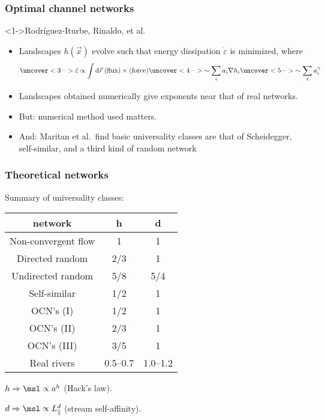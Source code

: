 \begin{frame}[label=]
  \frametitle{Optimal channel networks}

  \begin{block}<1->{Rodr\'iguez-Iturbe, Rinaldo, et al.\cite{rodriguez-iturbe1997a}}
    \begin{itemize}
    \item<2-> 
      Landscapes $h(\vec{x})$ evolve such that
      energy dissipation $\dot{\varepsilon}$ is minimized, where 
      $$
      \uncover<3->{
      \dot{\varepsilon} 
        \propto \int \mbox{d}\vec{r} \; (\mbox{flux}) \times (\mbox{force}) 
      }
      \uncover<4->{
        \sim  \sum_i a_i \nabla h_i 
      }
      \uncover<5->{
        \sim  \sum_i a_i^\gamma 
      }
      $$
    \item<6->
      Landscapes obtained numerically give exponents near that of real networks.
    \item<7->
      \alert{But:}
      numerical method used matters.
    \item<8->
      \alert{And:}
      Maritan et al.\ find basic universality
      classes are that of Scheidegger, self-similar,
      and a third kind of random network\cite{maritan1996b}
    \end{itemize}
  \end{block}
  
\end{frame}

\begin{frame}[label=]
  \frametitle{Theoretical networks}

  \begin{block}{Summary of universality classes:}
    \begin{center}
      \begin{tabular}{ccc}
        \hline\hline
        \textbf{network} & h & d \\
        \hline
        Non-convergent flow      & 1     & 1 \\
        Directed random          & 2/3   & 1 \\
        Undirected random        & 5/8 & 5/4 \\
        Self-similar             & 1/2 & 1 \\
        OCN's (I)                & 1/2 & 1 \\
        OCN's (II)               & 2/3 & 1 \\
        OCN's (III)              & 3/5 & 1 \\
        Real rivers              & 0.5--0.7 & 1.0--1.2 \\
        \hline\hline
      \end{tabular}

      $ h \Rightarrow \msl \propto a^h$ (Hack's law).

      $ d \Rightarrow \msl \propto L_\parallel^d$ (stream self-affinity).

    \end{center}
  \end{block}

\end{frame}



